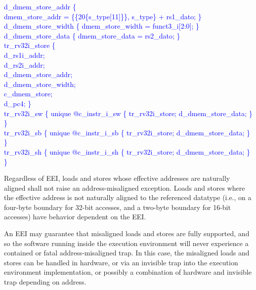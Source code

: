 \textcolor{blue}{
   d\_dmem\_store\_addr \{\\%
\indent \indent dmem\_store\_addr = \{\{20\{s\_type[11]\}\}, s\_type\} + rs1\_dato; \}\\%
\indent d\_dmem\_store\_width \{ dmem\_store\_width = funct3\_i[2:0]; \}\\%
\indent d\_dmem\_store\_data \{ dmem\_store\_data = rs2\_dato; \}\\%
\indent tr\_rv32i\_store \{\\%
\indent \hspace{\parindent} d\_rs1i\_addr; \\%
\indent \hspace{\parindent} d\_rs2i\_addr; \\%
\indent \hspace{\parindent} d\_dmem\_store\_addr; \\%
\indent \hspace{\parindent} d\_dmem\_store\_width; \\%
\indent \hspace{\parindent} c\_dmem\_store; \\%
\indent \hspace{\parindent} d\_pc4; \} \\%
\indent tr\_rv32i\_sw \{ unique @c\_instr\_i\_sw \{ tr\_rv32i\_store;  d\_dmem\_store\_data; \} \}\\%
\indent tr\_rv32i\_sb \{ unique @c\_instr\_i\_sb \{ tr\_rv32i\_store;  d\_dmem\_store\_data; \} \}\\%
\indent tr\_rv32i\_sh \{ unique @c\_instr\_i\_sh \{ tr\_rv32i\_store;  d\_dmem\_store\_data; \} \}\\%
}


Regardless of EEI, loads and stores whose effective addresses are
naturally aligned shall not raise an address-misaligned exception.
Loads and stores where the effective address is not naturally aligned
to the referenced datatype (i.e., on a four-byte boundary for 32-bit
accesses, and a two-byte boundary for 16-bit accesses) have behavior
dependent on the EEI.

An EEI may guarantee that misaligned loads and stores are fully
supported, and so the software running inside the execution
environment will never experience a contained or fatal
address-misaligned trap.  In this case, the misaligned loads and
stores can be handled in hardware, or via an invisible trap into the
execution environment implementation, or possibly a combination of
hardware and invisible trap depending on address.

